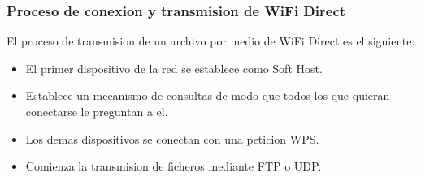 \begin{frame}
  \frametitle{Proceso de conexion y transmision de WiFi Direct}
  El proceso de transmision de un archivo por medio de WiFi Direct es el siguiente:

  \pause
  \begin{itemize}
  \item El primer dispositivo de la red se establece como Soft Host.
      \pause
    \item Establece un mecanismo de consultas de modo que todos los que quieran conectarse le preguntan a el.
      \pause
    \item Los demas dispositivos se conectan con una peticion WPS.
      \pause
    \item Comienza la transmision de ficheros mediante FTP o UDP.
  \end{itemize}
\end{frame}
    
    
